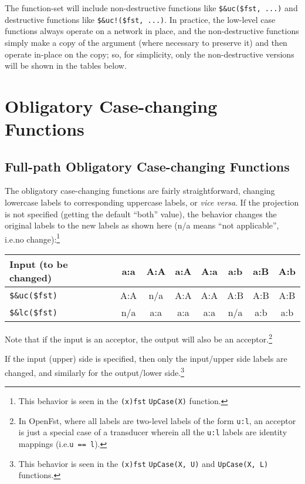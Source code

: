 \documentclass[letterpaper,12pt]{article}
\begin{document}
The function-set will include non-destructive functions like \verb!$&uc($fst, ...)! and
destructive functions like \verb/$&uc!($fst, ...)/.  In practice, the low-level case
functions
always operate on a network in place, and the non-destructive functions simply make
a copy of the argument (where necessary to preserve it) and then operate in-place
on the copy; so, for simplicity,
only the non-destructive versions will be shown in the tables below.

\section{Obligatory Case-changing Functions}

\subsection{Full-path Obligatory Case-changing Functions}

The obligatory case-changing functions are fairly straightforward, changing lowercase labels to
corresponding uppercase labels, or \emph{vice versa}.  If the projection is not
specified (getting the default ``both'' value), the behavior changes the
original labels to the new labels as shown here
(n/a means ``not applicable'', i.e.\@ no change):\footnote{This behavior is
seen in the \texttt{(x)fst} \texttt{UpCase(X)} function.}

\vspace{.5cm}
\noindent
\begin{tabular}{|l|c|c|c|c|c|c|c|}
\hline
Input (to be changed)  & a:a & A:A & a:A & A:a & a:b & a:B & A:b \\
\hline
\verb/$&uc($fst)/  & A:A & n/a & A:A & A:A & A:B & A:B & A:B \\
\hline
\verb/$&lc($fst)/  & n/a & a:a & a:a & a:a & n/a & a:b & a:b \\
\hline
\end{tabular}
\vspace{.5cm}

\noindent
Note that if the input is an acceptor, the output will also be an
acceptor.\footnote{In OpenFst, where all labels are two-level labels of
the form \texttt{u:l}, an acceptor is just a special case of a transducer
wherein all the \texttt{u:l} labels are identity mappings (i.e.\@ \texttt{u
== l}).}

If the input (upper) side is specified, then only the input/upper side labels are changed, and
similarly for the output/lower side.\footnote{This behavior is seen in the
\texttt{(x)fst} \texttt{UpCase(X, U)} and \texttt{UpCase(X, L)} functions.}
\end{document}
